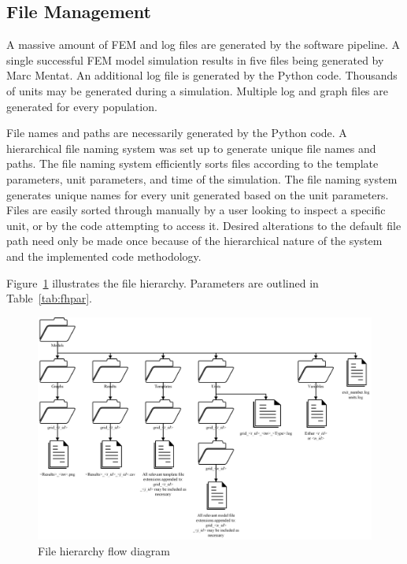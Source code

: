 \subsection{File Management}
\label{ssec:fm}

A massive amount of FEM and log files are generated by the software pipeline. A single successful FEM model simulation results in five files being generated by Marc Mentat. An additional log file is generated by the Python code. Thousands of units may be generated during a simulation. Multiple log and graph files are generated for every population.

File names and paths are necessarily generated by the Python code. A hierarchical file naming system was set up to generate unique file names and paths. The file naming system efficiently sorts files according to the template parameters, unit parameters, and time of the simulation. The file naming system generates unique names for every unit generated based on the unit parameters. Files are easily sorted through manually by a user looking to inspect a specific unit, or by the code attempting to access it. Desired alterations to the default file path need only be made once because of the hierarchical nature of the system and the implemented code methodology.

Figure~\ref{fig:fh} illustrates the file hierarchy. Parameters are outlined in Table~\ref{tab:fhpar}.

\begin{landscape}
 \begin{figure}[H]
  \centering
  \includegraphics[width=1.4\textwidth]{FileHierarchy.png}
  \caption{File hierarchy flow diagram}
  \label{fig:fh}
 \end{figure}
\end{landscape}

